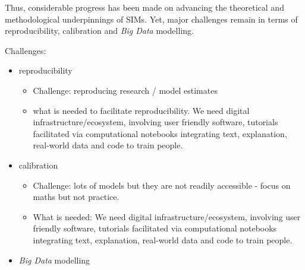 \documentclass[11pt,letterpaper]{article}
\providecommand{\tightlist}{%
  \setlength{\itemsep}{0pt}\setlength{\parskip}{0pt}}
\begin{document}
Thus, considerable progress has been made on advancing the theoretical and methodological underpinnings of SIMs.
Yet, major challenges remain in terms of reproducibility, calibration and \emph{Big Data} modelling.

Challenges:

\begin{itemize}
\tightlist
\item
  reproducibility

  \begin{itemize}
  \tightlist
  \item
    Challenge: reproducing research / model estimates
  \item
    what is needed to facilitate reproducibility. We need digital infrastructure/ecosystem, involving user friendly software, tutorials facilitated via computational notebooks integrating text, explanation, real-world data and code to train people.
  \end{itemize}
\item
  calibration

  \begin{itemize}
  \item
    Challenge: lots of models but they are not readily accessible - focus on maths but not practice.
  \item
    What is needed: We need digital infrastructure/ecosystem, involving user friendly software, tutorials facilitated via computational notebooks integrating text, explanation, real-world data and code to train people.
  \end{itemize}
\item
  \emph{Big Data} modelling


\end{itemize}
\end{document}

